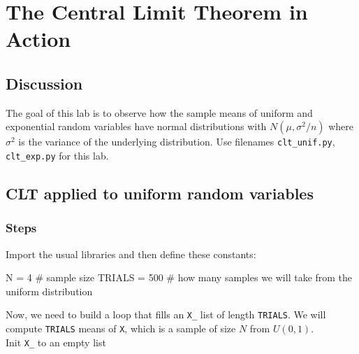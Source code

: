 \chapter{The Central Limit Theorem in Action}

\setcounter{problem}{1}

\section{Discussion}

\begin{fullwidth}

The goal of this lab is to observe how the sample means of uniform and exponential random variables have normal distributions with $N(\mu, \sigma^2/n)$ where $\sigma^2$ is the variance of the underlying distribution. Use filenames {\tt clt\_unif.py}, {\tt clt\_exp.py} for this lab.

\section{CLT applied to uniform random variables}

\subsection{Steps}


\step Import the usual libraries and then define these constants:

\begin{pyverbatim}
N = 4  # sample size
TRIALS = 500 # how many samples we will take from the uniform distribution
\end{pyverbatim}

Now, we need to build a loop that fills an {\tt X\_} list of length {\tt TRIALS}.  We will compute {\tt TRIALS} means of {\tt X}, which is a sample of size $N$ from $U(0,1)$. \\

\step Init {\tt X\_} to an empty list


\end{fullwidth}
